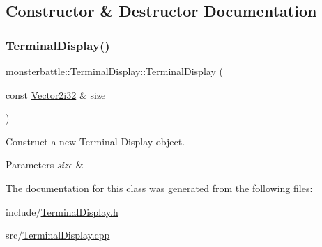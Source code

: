 \subsection{Constructor \& Destructor Documentation}
\mbox{\label{classmonsterbattle_1_1TerminalDisplay_aab55383157d04b355c3b6aca0abfb4a6}} 
\subsubsection{\texorpdfstring{Terminal\+Display()}{TerminalDisplay()}}
{\footnotesize\ttfamily monsterbattle\+::\+Terminal\+Display\+::\+Terminal\+Display (\begin{DoxyParamCaption}\item[{const \hyperlink{structmonsterbattle_1_1Vector}{Vector2i32} \&}]{size }\end{DoxyParamCaption})}



Construct a new Terminal Display object. 


\begin{DoxyParams}{Parameters}
{\em size} & \\
\hline
\end{DoxyParams}


The documentation for this class was generated from the following files\+:\begin{DoxyCompactItemize}
\item 
include/\hyperlink{TerminalDisplay_8h}{Terminal\+Display.\+h}\item 
src/\hyperlink{TerminalDisplay_8cpp}{Terminal\+Display.\+cpp}\end{DoxyCompactItemize}
